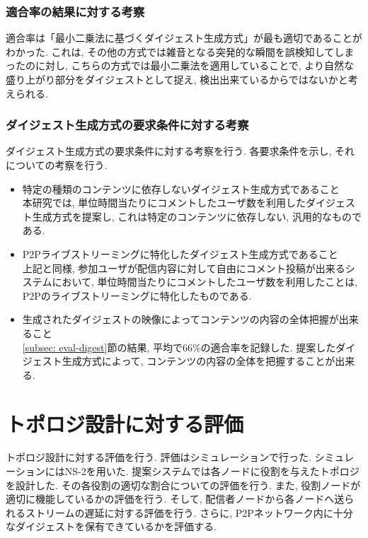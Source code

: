 \subsubsection{適合率の結果に対する考察}
適合率は「最小二乗法に基づくダイジェスト生成方式」が最も適切であることがわかった. これは, その他の方式では雑音となる突発的な瞬間を誤検知してしまったのに対し, こちらの方式では最小二乗法を適用していることで, より自然な盛り上がり部分をダイジェストとして捉え, 検出出来ているからではないかと考えられる.

\subsubsection{ダイジェスト生成方式の要求条件に対する考察}
ダイジェスト生成方式の要求条件に対する考察を行う. 各要求条件を示し, それについての考察を行う.

\begin{itemize}
\item 特定の種類のコンテンツに依存しないダイジェスト生成方式であること \\
本研究では, 単位時間当たりにコメントしたユーザ数を利用したダイジェスト生成方式を提案し, これは特定のコンテンツに依存しない, 汎用的なものである.
\item P2Pライブストリーミングに特化したダイジェスト生成方式であること \\
上記と同様, 参加ユーザが配信内容に対して自由にコメント投稿が出来るシステムにおいて, 単位時間当たりにコメントしたユーザ数を利用したことは, P2Pのライブストリーミングに特化したものである.
\item 生成されたダイジェストの映像によってコンテンツの内容の全体把握が出来ること \\
\ref{subsec: eval-digest}節の結果, 平均で66\%の適合率を記録した. 提案したダイジェスト生成方式によって, コンテンツの内容の全体を把握することが出来る.
\end{itemize}


\section{トポロジ設計に対する評価}
トポロジ設計に対する評価を行う. 評価はシミュレーションで行った. シミュレーションにはNS-2を用いた. 提案システムでは各ノードに役割を与えたトポロジを設計した. その各役割の適切な割合についての評価を行う. また, 役割ノードが適切に機能しているかの評価を行う. そして, 配信者ノードから各ノードへ送られるストリームの遅延に対する評価を行う. さらに, P2Pネットワーク内に十分なダイジェストを保有できているかを評価する.

